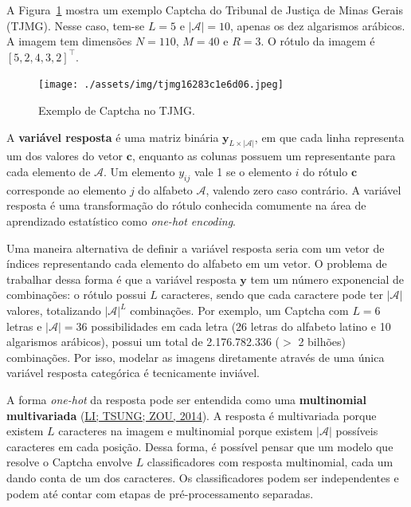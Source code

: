 \documentclass[12pt,twoside,brazilian]{book}
\begin{document}
A Figura~\ref{fig-exemplo-tjmg} mostra um exemplo Captcha do Tribunal de
Justiça de Minas Gerais (TJMG). Nesse caso, tem-se \(L=5\) e
\(|\mathcal A|=10\), apenas os dez algarismos arábicos. A imagem tem
dimensões \(N=110\), \(M=40\) e \(R=3\). O rótulo da imagem é
\([5,2,4,3,2]^\top\).

\begin{figure}

{\centering \texttt{[image: ./assets/img/tjmg16283c1e6d06.jpeg]}

}

\caption{\label{fig-exemplo-tjmg}Exemplo de Captcha no TJMG.}

\end{figure}

A \textbf{variável resposta} é uma matriz binária
\(\mathbf y_{L \times |\mathcal A|}\), em que cada linha representa um
dos valores do vetor \(\mathbf c\), enquanto as colunas possuem um
representante para cada elemento de \(\mathcal A\). Um elemento
\(y_{ij}\) vale 1 se o elemento \(i\) do rótulo \(\mathbf c\)
corresponde ao elemento \(j\) do alfabeto \(\mathcal A\), valendo zero
caso contrário. A variável resposta é uma transformação do rótulo
conhecida comumente na área de aprendizado estatístico como
\emph{one-hot encoding}.

Uma maneira alternativa de definir a variável resposta seria com um
vetor de índices representando cada elemento do alfabeto em um vetor. O
problema de trabalhar dessa forma é que a variável resposta
\(\mathbf y\) tem um número exponencial de combinações: o rótulo possui
\(L\) caracteres, sendo que cada caractere pode ter \(|\mathcal A|\)
valores, totalizando \(|\mathcal A|^L\) combinações. Por exemplo, um
Captcha com \(L=6\) letras e \(|\mathcal A| = 36\) possibilidades em
cada letra (26 letras do alfabeto latino e 10 algarismos arábicos),
possui um total de 2.176.782.336 (\(>\) 2 bilhões) combinações. Por
isso, modelar as imagens diretamente através de uma única variável
resposta categórica é tecnicamente inviável.

A forma \emph{one-hot} da resposta pode ser entendida como uma
\textbf{multinomial} \textbf{multivariada}
(\protect\hyperlink{ref-li2014}{LI; TSUNG; ZOU, 2014}). A resposta é
multivariada porque existem \(L\) caracteres na imagem e multinomial
porque existem \(|\mathcal A|\) possíveis caracteres em cada posição.
Dessa forma, é possível pensar que um modelo que resolve o Captcha
envolve \(L\) classificadores com resposta multinomial, cada um dando
conta de um dos caracteres. Os classificadores podem ser independentes e
podem até contar com etapas de pré-processamento separadas.
\end{document}
